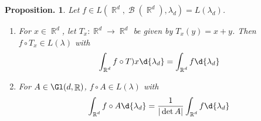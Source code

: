 \documentclass[11pt, a4paper]{memoir}
\DeclareMathOperator{\R}{{\mathbb{R}}}
\theoremstyle{change}
\newtheorem{proposition}[theorem]{Proposition.}
\theoremstyle{plain}
\theoremstyle{nonumberplain}
\DeclareMathOperator{\B}{{\mathcal{B}}}
\begin{document}
\begin{proposition}
    Let $f\in L(\R^d,\B(\R^d),\lambda_d)=L(\lambda_d)$.
    \begin{enumerate}[nolistsep,label=(\roman*)]
        \item For $x\in\R^d$, let $T_x:\R^d\to\R^d$ be given by $T_x(y)=x+y$.
            Then $f\circ T_x\in L(\lambda)$ with
            \begin{equation*}
                \int_{\R^d}f\circ T)x\d{\lambda_d}=\int_{\R^d}f\d{\lambda_d}
            \end{equation*}
        \item For $A\in\Gl(d,\R)$, $f\circ A\in L(\lambda)$ with
            \begin{equation*}
                \int_{\R^d}f\circ A\d{\lambda_d}=\frac{1}{|\det A|}\int_{\R^d}f\d{\lambda_d}
            \end{equation*}
    \end{enumerate}
\end{proposition}
\end{document}
